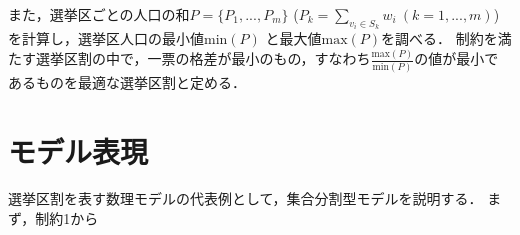 また，選挙区ごとの人口の和$P=\{P_1,...,P_m\}$ ($P_k=\sum_{v_i\in S_k}w_i\ (k=1,...,m)$)を計算し，選挙区人口の最小値$\mathrm{min}(P)$ と最大値$\mathrm{max}(P)$を調べる．
制約を満たす選挙区割の中で，一票の格差が最小のもの，すなわち$\frac{\mathrm{max}(P)}{\mathrm{min}(P)}$の値が最小であるものを最適な選挙区割と定める．


\section{モデル表現}
選挙区割を表す数理モデルの代表例として，集合分割型モデルを説明する．
まず，制約1から




